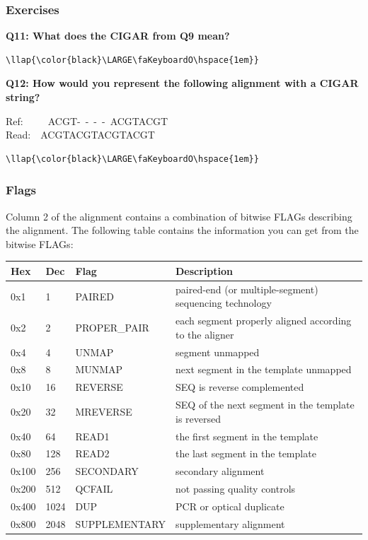 \documentclass[11pt]{article}
\begin{document}
\hypertarget{exercises}{%
\subsubsection{Exercises}\label{exercises}}

\textbf{Q11: What does the CIGAR from Q9 mean?}

\begin{terminalinput}
\begin{Verbatim}[commandchars=\\\{\}]
\llap{\color{black}\LARGE\faKeyboardO\hspace{1em}}
\end{Verbatim}
\end{terminalinput}

    \textbf{Q12: How would you represent the following alignment with a
CIGAR string?}

Ref:~~~~~ACGT-~-~-~-~ACGTACGT\\
Read:~~ACGTACGTACGTACGT

\begin{terminalinput}
\begin{Verbatim}[commandchars=\\\{\}]
\llap{\color{black}\LARGE\faKeyboardO\hspace{1em}}
\end{Verbatim}
\end{terminalinput}

    \hypertarget{flags}{%
\subsubsection{Flags}\label{flags}}

Column 2 of the alignment contains a combination of bitwise FLAGs
describing the alignment. The following table contains the information
you can get from the bitwise FLAGs:

\begin{longtable}[]{@{}llll@{}}
\hline
Hex & Dec & Flag & Description\tabularnewline
\hline
\endhead
0x1 & 1 & PAIRED & paired-end (or multiple-segment) sequencing
technology\tabularnewline
0x2 & 2 & PROPER\_PAIR & each segment properly aligned according to the
aligner\tabularnewline
0x4 & 4 & UNMAP & segment unmapped\tabularnewline
0x8 & 8 & MUNMAP & next segment in the template unmapped\tabularnewline
0x10 & 16 & REVERSE & SEQ is reverse complemented\tabularnewline
0x20 & 32 & MREVERSE & SEQ of the next segment in the template is
reversed\tabularnewline
0x40 & 64 & READ1 & the first segment in the template\tabularnewline
0x80 & 128 & READ2 & the last segment in the template\tabularnewline
0x100 & 256 & SECONDARY & secondary alignment\tabularnewline
0x200 & 512 & QCFAIL & not passing quality controls\tabularnewline
0x400 & 1024 & DUP & PCR or optical duplicate\tabularnewline
0x800 & 2048 & SUPPLEMENTARY & supplementary alignment\tabularnewline
\hline
\end{longtable}
\end{document}
